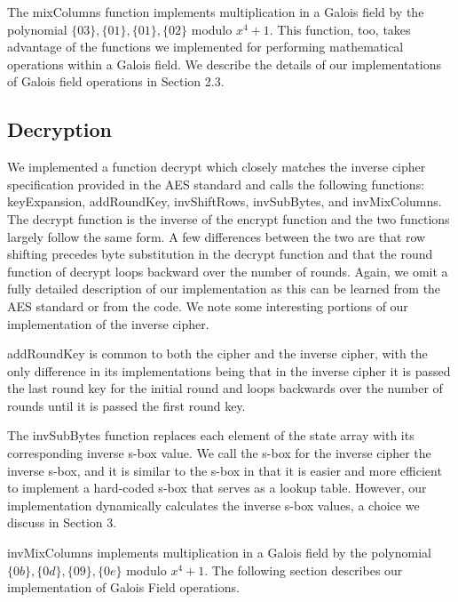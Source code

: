 \documentclass[a4paper,12pt]{article}
\begin{document}
The {\selectfont mixColumns} function implements multiplication in a Galois field by the polynomial $\{03\}, \{01\}, \{01\}, \{02\}$ modulo $x^4 + 1$. This function, too, takes advantage of the functions we implemented for performing mathematical operations within a Galois field. We describe the details of our implementations of Galois field operations in Section 2.3.


\subsection{Decryption}

We implemented a function {\selectfont decrypt} which closely matches the inverse cipher specification provided in the AES standard \cite{AES} and calls the following functions: {\selectfont keyExpansion}, {\selectfont addRoundKey}, {\selectfont invShiftRows}, {\selectfont invSubBytes}, and {\selectfont invMixColumns}. The {\selectfont decrypt} function is the inverse of the {\selectfont encrypt} function and the two functions largely follow the same form. A few differences between the two are that row shifting precedes byte substitution in the {\selectfont decrypt} function and that the round function of {\selectfont decrypt} loops backward over the number of rounds. Again, we omit a fully detailed description of our implementation as this can be learned from the AES standard or from the code. We note some interesting portions of our implementation of the inverse cipher.

{\selectfont addRoundKey} is common to both the cipher and the inverse cipher, with the only difference in its implementations being that in the inverse cipher it is passed the last round key for the initial round and loops backwards over the number of rounds until it is passed the first round key. 

The {\selectfont invSubBytes} function replaces each element of the state array with its corresponding inverse s-box value. We call the s-box for the inverse cipher the inverse s-box, and it is similar to the s-box in that it is easier and more efficient to implement a hard-coded s-box that serves as a lookup table. However, our implementation dynamically calculates the inverse s-box values, a choice we discuss in Section 3.

{\selectfont invMixColumns} implements multiplication in a Galois field by the polynomial $\{0b\}, \{0d\}, \{09\}, \{0e\}$ modulo $x^4 + 1$. The following section describes our implementation of Galois Field operations.
\end{document}
